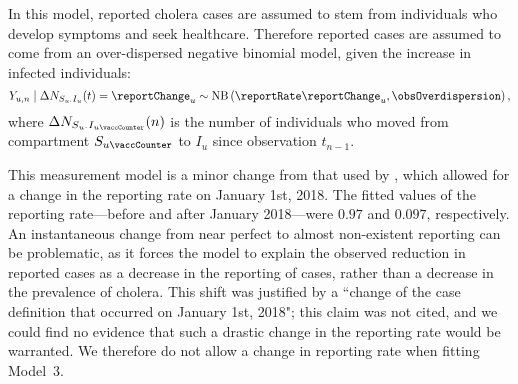 In this model, reported cholera cases are assumed to stem from individuals who develop symptoms and seek healthcare.
Therefore reported cases are assumed to come from an over-dispersed negative binomial model, given the increase in infected individuals:
\begin{equation}
  \label{model3:meas}
  Y_{u, n} \mid \Delta N_{S_{u \cdot}I_{u}}(t) = \reportChange_u \sim \text{NB}\left(\reportRate \reportChange_{u}, \obsOverdispersion \right),
\end{equation}
where $\Delta N_{S_{u \cdot}I_{u \vaccCounter}}(n)$ is the number of individuals who moved from compartment $S_{u \vaccCounter}$ to $I_{u}$ since observation $t_{n-1}$.

This measurement model is a minor change from that used by \cite{lee20}, which allowed for a change in the reporting rate on January 1st, 2018.
The fitted values of the reporting rate---before and after January 2018---were $0.97$ and $0.097$, respectively.
An instantaneous change from near perfect to almost non-existent reporting can be problematic, as it forces the model to explain the observed reduction in reported cases as a decrease in the reporting of cases, rather than a decrease in the prevalence of cholera.
This shift was justified by a ``change of the case definition that occurred on January 1st, 2018";
this claim was not cited, and we could find no evidence that such a drastic change in the reporting rate would be warranted.
We therefore do not allow a change in reporting rate when fitting Model~3.
